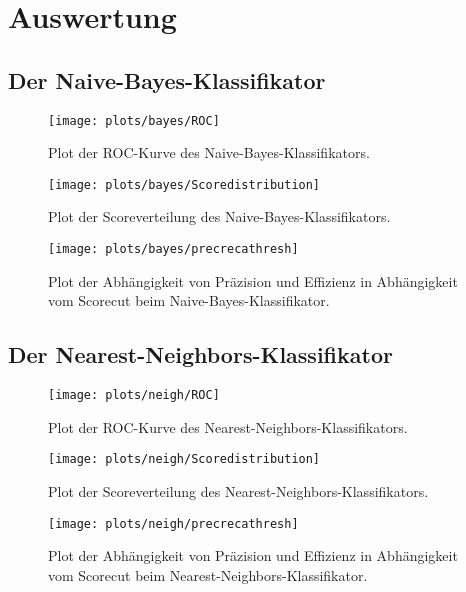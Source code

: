 \section{Auswertung}

\subsection{Der Naive-Bayes-Klassifikator}




\begin{figure}
	\centering
	\texttt{[image: plots/bayes/ROC]}
	\caption{Plot der ROC-Kurve des Naive-Bayes-Klassifikators.}
	\label{fig:NB_ROC}
\end{figure}

\begin{figure}
	\centering
	\texttt{[image: plots/bayes/Scoredistribution]}
	\caption{Plot der Scoreverteilung des Naive-Bayes-Klassifikators.}
	\label{fig:NB_SD}
\end{figure}

\begin{figure}
	\centering
	\texttt{[image: plots/bayes/precrecathresh]}
	\caption{Plot der Abhängigkeit von Präzision und Effizienz in Abhängigkeit vom Scorecut beim Naive-Bayes-Klassifikator.}
	\label{fig:NB_PRT}
\end{figure}


\subsection{Der Nearest-Neighbors-Klassifikator}

\begin{figure}
	\centering
	\texttt{[image: plots/neigh/ROC]}
	\caption{Plot der ROC-Kurve des Nearest-Neighbors-Klassifikators.}
	\label{fig:NN_ROC}
\end{figure}

\begin{figure}
	\centering
	\texttt{[image: plots/neigh/Scoredistribution]}
	\caption{Plot der Scoreverteilung des Nearest-Neighbors-Klassifikators.}
	\label{fig:NN_SD}
\end{figure}

\begin{figure}
	\centering
	\texttt{[image: plots/neigh/precrecathresh]}
	\caption{Plot der Abhängigkeit von Präzision und Effizienz in Abhängigkeit vom Scorecut beim Nearest-Neighbors-Klassifikator.}
	\label{fig:NN_PRT}
\end{figure}


